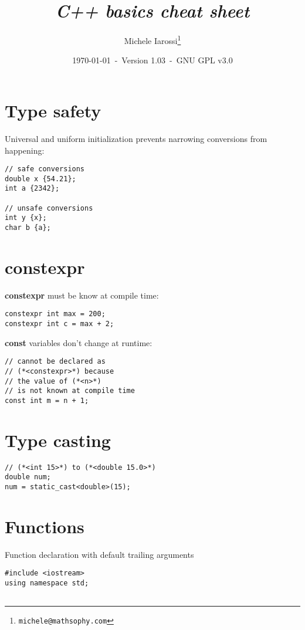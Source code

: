 \documentclass[10pt]{article}
\begin{document}
\title{\emph{C++ basics cheat sheet}}
\author{Michele Iarossi\thanks{\texttt{michele@mathsophy.com}}}
\date{\small \today~-~Version 1.03~-~GNU GPL v3.0}


\maketitle

\begin{multicols*}{3}
%
%
\section*{Type safety}
\small
Universal and uniform initialization prevents narrowing
conversions from happening:
\lstset {language=C++}
\begin{lstlisting}
// safe conversions
double x {54.21};
int a {2342};

// unsafe conversions
int y {x};
char b {a};
\end{lstlisting}
%
%
\section*{constexpr}
\small
\lstset {language=C++}
\textbf{constexpr} must be know at compile time:
\begin{lstlisting}
constexpr int max = 200;
constexpr int c = max + 2;
\end{lstlisting}
\lstset {language=C++}
\textbf{const} variables don't change at runtime:
\begin{lstlisting}
// cannot be declared as 
// (*<constexpr>*) because
// the value of (*<n>*)
// is not known at compile time
const int m = n + 1;
\end{lstlisting}
%
%
\section*{Type casting}
\small
\lstset {language=C++}
\begin{lstlisting}
// (*<int 15>*) to (*<double 15.0>*)
double num;
num = static_cast<double>(15);
\end{lstlisting}
%
%
\section*{Functions}
\small
Function declaration with
default trailing arguments
\lstset {language=C++}
\begin{lstlisting}
#include <iostream>
using namespace std;


\end{lstlisting}
\end{multicols*}
\end{document}
